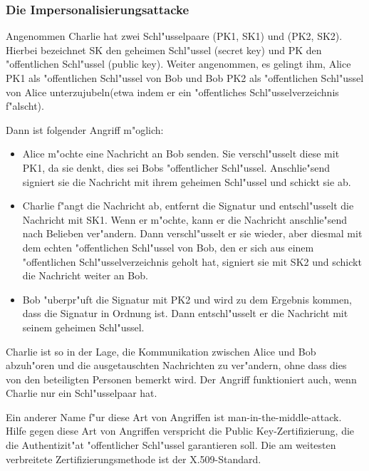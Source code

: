 \subsubsection{Die Impersonalisierungsattacke} 
 \label{Impersonalisierungsattacke}

Angenommen Charlie hat zwei Schl"usselpaare (PK1, SK1) und (PK2, SK2). 
Hierbei bezeichnet SK den geheimen Schl"ussel (secret key) und PK den
"offentlichen Schl"ussel (public key). Weiter angenommen, es gelingt ihm,
Alice PK1 als "offentlichen Schl"ussel von Bob und Bob PK2 als
"offentlichen Schl"ussel von Alice \glqq unterzujubeln\grqq (etwa indem
er ein "offentliches Schl"usselverzeichnis f"alscht).

Dann ist folgender Angriff m"oglich:
\begin{itemize}
    \item Alice m"ochte eine Nachricht an Bob senden. Sie verschl"usselt diese mit
          PK1, da sie denkt, dies sei Bobs "offentlicher Schl"ussel. Anschlie"send signiert sie die
          Nachricht mit ihrem geheimen Schl"ussel und schickt sie ab.
    \item Charlie f"angt die Nachricht ab, entfernt die Signatur und entschl"usselt
          die Nachricht mit SK1. Wenn er m"ochte, kann er die Nachricht anschlie"send nach Belieben
          ver"andern. Dann verschl"usselt er sie wieder, aber diesmal mit dem echten "offentlichen
          Schl"ussel von Bob, den er sich aus einem "offentlichen Schl"usselverzeichnis geholt
          hat, signiert sie mit SK2 und schickt die Nachricht weiter an Bob.
    \item Bob "uberpr"uft die Signatur mit PK2 und wird zu dem Ergebnis kommen, dass die Signatur in
          Ordnung ist. Dann entschl"usselt er die Nachricht mit seinem geheimen Schl"ussel.
\end{itemize}

Charlie ist so in der Lage, die Kommunikation zwischen Alice und Bob abzuh"oren und die ausgetauschten
Nachrichten zu ver"andern, ohne dass dies von den beteiligten Personen bemerkt wird. Der Angriff funktioniert
auch, wenn Charlie nur ein Schl"usselpaar hat.

Ein anderer Name f"ur diese Art von Angriffen ist 
\glqq man-in-the-middle-attack\grqq. Hilfe gegen diese Art
von Angriffen verspricht die Public Key-Zertifizierung, die die  Authentizit"at "offentlicher Schl"ussel
garantieren soll. Die am weitesten verbreitete Zertifizierungsmethode ist der X.509-Standard.

